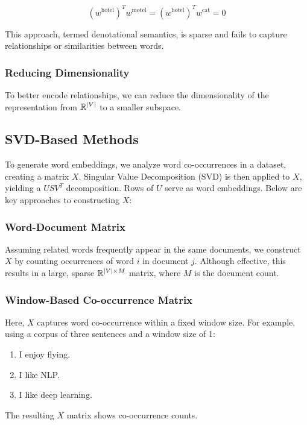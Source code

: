 \begin{equation*}
    (w^{\text{hotel}})^{T}w^{\text{motel}} = (w^{\text{hotel}})^{T}w^{\text{cat}} = 0
\end{equation*}

This approach, termed denotational semantics, is sparse and fails to capture relationships or similarities between words.

\subsubsection{Reducing Dimensionality}
To better encode relationships, we can reduce the dimensionality of the representation from $\Bbb{R}^{\left| V \right|}$ to a smaller subspace.



\subsection{SVD-Based Methods}
To generate word embeddings, we analyze word co-occurrences in a dataset, creating a matrix $X$. Singular Value Decomposition (SVD) is then applied to $X$, yielding a $USV^{T}$ decomposition. Rows of $U$ serve as word embeddings. Below are key approaches to constructing $X$:

\subsubsection{Word-Document Matrix}
Assuming related words frequently appear in the same documents, we construct $X$ by counting occurrences of word $i$ in document $j$. Although effective, this results in a large, sparse $\Bbb{R}^{\left| V \right| \times M}$ matrix, where $M$ is the document count.

\subsubsection{Window-Based Co-occurrence Matrix}
Here, $X$ captures word co-occurrence within a fixed window size. For example, using a corpus of three sentences and a window size of 1:
\begin{enumerate}
    \item I enjoy flying.
    \item I like NLP.
    \item I like deep learning.
\end{enumerate}
The resulting $X$ matrix shows co-occurrence counts.


